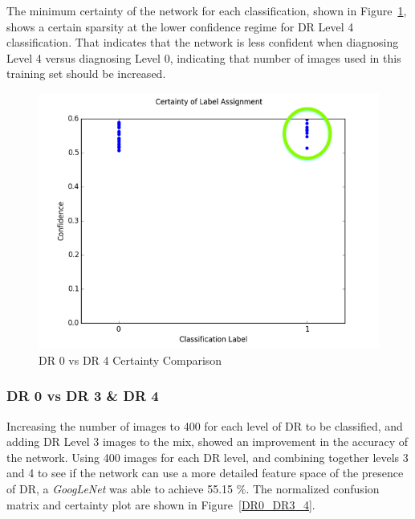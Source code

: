 \documentclass[letterpaper,12pt]{article}
\newcommand{\figref}[1]{Figure~\ref{#1}}
\begin{document}
The minimum certainty of the network for each classification, shown in \figref{C_DR0_DR4}, shows a certain sparsity at the lower confidence regime for DR Level 4 classification. That indicates that the network is less confident when diagnosing Level 4 versus diagnosing Level 0, indicating that number of images used in this training set should be increased.

\begin{figure}[htbp]
\begin{center}
\includegraphics[scale=0.5]{images/Certainty_DR0_DR4.png}
\caption{DR 0 vs DR 4 Certainty Comparison}
\label{C_DR0_DR4}
\end{center}
\end{figure}

\subsubsection{DR 0 vs DR 3 \& DR 4}

Increasing the number of images to 400 for each level of DR to be classified, and adding DR Level 3 images to the mix, showed an improvement in the accuracy of the network. Using 400 images for each DR level, and combining together levels 3 and 4 to see if the network can use a more detailed feature space of the presence of DR, a \textit{GoogLeNet} was able to achieve 55.15 $\%$. The normalized confusion matrix and certainty plot are shown in \figref{DR0_DR3_4}.
\end{document}
